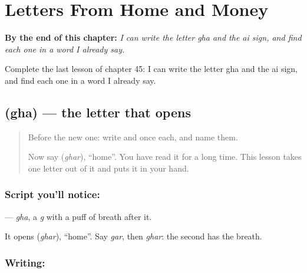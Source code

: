 
\chapter{Letters From Home and Money}
\label{ch:gu-letters-home-money}

\begin{chapteropening}
\textbf{By the end of this chapter:} \emph{I can write the letter gha and the ai sign, and find each one in a word I already say.}

Complete the last lesson of chapter 45: I can write the letter gha and the ai sign, and find each one in a word I already say.
\end{chapteropening}

\section[\texorpdfstring{\gu{ઘ} (gha)}{ઘ (gha)}]{ (gha) — the letter that opens }

\label{lesson:GU-W45-gha}



\begin{quote}
Before the new one: write  and  once each, and name them.

Now say \textbf{} (\emph{ghar}), \textquotedblleft{}home\textquotedblright{}. You have read it for a long time. This lesson takes one letter out of it and puts it in your hand.
\end{quote}

\subsection*{Script you'll notice: }
\textbf{} — \emph{gha}, a \emph{g} with a puff of breath after it.

It opens \textbf{} (\emph{ghar}), \textquotedblleft{}home\textquotedblright{}. Say \emph{gar}, then \emph{ghar}: the second has the breath.

\subsection*{Writing: }

